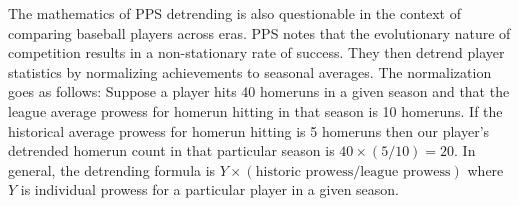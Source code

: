 \documentclass[11pt]{article}\usepackage[]{graphicx}\usepackage[]{color}
\begin{document}
The mathematics of PPS detrending is also questionable in the context of 
comparing baseball players across eras. 
PPS notes that the evolutionary nature of competition results in a 
non-stationary rate of success.  They then detrend player 
statistics by normalizing achievements to seasonal averages.  
The normalization goes as follows: 
	Suppose a player hits 40 homeruns in a given season and that the league 
	average prowess for homerun hitting in that season is 10 homeruns. If the 
	historical average prowess for homerun hitting is 5 homeruns then our 
	player's detrended homerun count in that particular season is 
	$40\times(5/10) = 20$.  In general, the detrending formula is 
	$Y \times (\text{historic prowess} / \text{league prowess})$ where $Y$ is 
  individual prowess for a particular player in a given season.
\end{document}
